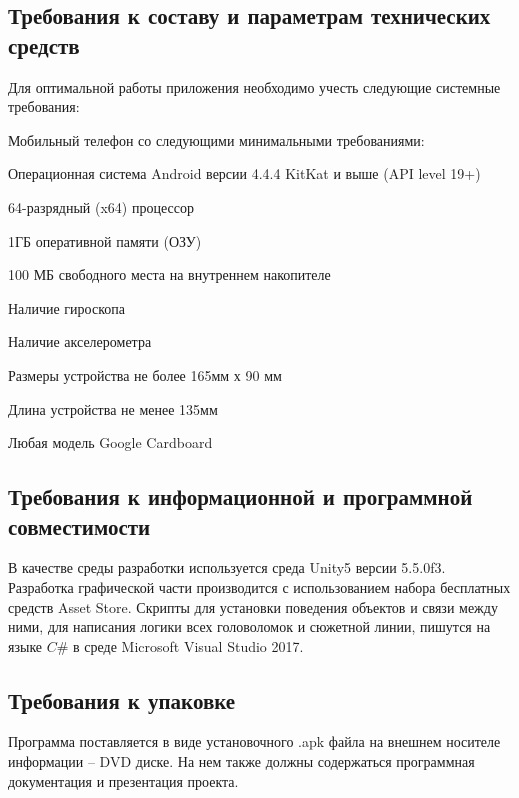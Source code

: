 \subsection{Требования к составу и параметрам технических средств}
Для оптимальной работы приложения необходимо учесть следующие системные требования:
\begin{my_enumerate}
\item Мобильный телефон со следующими минимальными требованиями:
    \begin{my_enumerate}
   	\item Операционная система Android версии 4.4.4 KitKat и выше (API level 19+)
    \item 64-разрядный (x64) процессор
    \item 1ГБ оперативной памяти (ОЗУ)
    \item 100 МБ свободного места на внутреннем накопителе
    \item Наличие гироскопа
    \item Наличие акселерометра
    \item Размеры устройства не более 165мм х 90 мм
    \item Длина устройства не менее 135мм
    \end{my_enumerate}
\item Любая модель Google Cardboard
\end{my_enumerate}


\subsection{Требования к информационной и программной совместимости}
В качестве среды разработки используется среда Unity5 версии 5.5.0f3.
Разработка графической части производится с использованием набора бесплатных средств Asset Store.
Скрипты для установки поведения объектов и связи между ними, для написания логики всех головоломок и сюжетной линии, пишутся на языке $C\#$ в среде Microsoft Visual Studio 2017. 


\subsection{Требования к упаковке}
Программа поставляется в виде установочного .apk файла на внешнем носителе информации – DVD диске. На нем также должны содержаться программная документация и презентация проекта.
